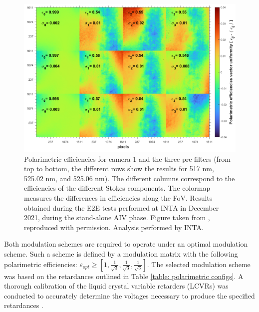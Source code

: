 \begin{figure}[t]
    \includegraphics[width=\textwidth]{figures/TuMag/Pol_efficiencies_map.png}
    \caption[TuMag's polarimetric efficiencies.]{Polarimetric efficiencies for camera 1 and the three pre-filters (from top to bottom, the different rows show the results for 517 nm, 525.02 nm, and 525.06 nm). The different columns correspond to the efficiencies of the different Stokes components. The colormap measures the differences in efficiencies along the FoV. Results obtained during the E2E tests performed at INTA in December 2021, during the stand-alone AIV phase. Figure taken from \citep{tumag}, reproduced with permission. Analysis performed by INTA. \label{fig_tumag:pol eff maps}}
\end{figure}

Both modulation schemes are required to operate under an optimal modulation scheme. Such a scheme is defined by a modulation matrix with the following polarimetric efficiencies: $\varepsilon _{opt} \geqslant [1, \frac{1}{\sqrt{3}}, \frac{1}{\sqrt{3}}, \frac{1}{\sqrt{3}}]$. The selected modulation scheme was based on the retardances outlined in Table \ref{table: polarimetric configs}. A thorough calibration of the liquid crystal variable retarders (LCVRs) was conducted to accurately determine the voltages necessary to produce the specified retardances \citep{fine-tunin}.

